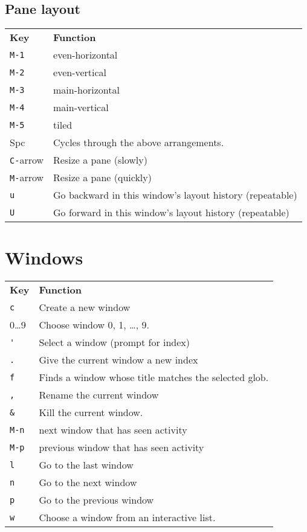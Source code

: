 \documentclass[landscape]{article}
\newcommand{\thead}[1]{{\color{black}\bf#1}}
\newcommand{\blankfirst}{%
  \ifodd\rownum\advance\rownum1\relax\fi}
\begin{document}
\begin{multicols}{3}
  \subsection*{\color{gray!80}Pane layout}
  \blankfirst
  \noindent\begin{tabular}{p{0.6in}p{2.3in}} %
    \thead{Key} & \thead{Function}\\
    \verb|M-1| & even-horizontal\\
    \verb|M-2| & even-vertical\\
    \verb|M-3| & main-horizontal\\
    \verb|M-4| & main-vertical\\
    \verb|M-5| & tiled\\
    Spc & Cycles through the above arrangements.\\
    \verb|C-|arrow & Resize a pane (slowly)\\
    \verb|M-|arrow & Resize a pane (quickly)\\
    \verb|u| & Go backward in this window's layout history (repeatable)\\
    \verb|U| & Go forward in this window's layout history (repeatable)\\
  \end{tabular}   
  \columnbreak

  \section*{Windows}
  \blankfirst
  \noindent\begin{tabular}{p{0.6in}p{2.3in}} %
    \thead{Key} & \thead{Function}\\
    \verb|c| & Create a new window\\
    0\dots9 & Choose window 0, 1, \dots, 9.\\
    \verb|'| & Select a window (prompt for index)\\
    \verb|.| & Give the current window a new index\\
    \verb|f| & Finds a window whose title matches the selected glob.\\
    \verb|,| & Rename the current window\\
    \verb|&| & Kill the current window.\\
    \verb|M-n| & next window that has seen activity\\
    \verb|M-p| & previous window that has seen activity\\
    \verb|l| & Go to the last window\\
    \verb|n| & Go to the next window\\
    \verb|p| & Go to the previous window\\
    \verb|w| & Choose a window from an interactive list.\\
  \end{tabular}

\end{multicols}
\end{document}
